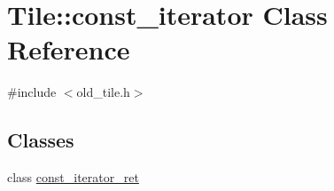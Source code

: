 \hypertarget{classTile_1_1const__iterator}{}\section{Tile\+:\+:const\+\_\+iterator Class Reference}
\label{classTile_1_1const__iterator}


{\ttfamily \#include $<$old\+\_\+tile.\+h$>$}

\subsection*{Classes}
\begin{DoxyCompactItemize}
\item 
class \hyperlink{classTile_1_1const__iterator_1_1const__iterator__ret}{const\+\_\+iterator\+\_\+ret}
\end{DoxyCompactItemize}
